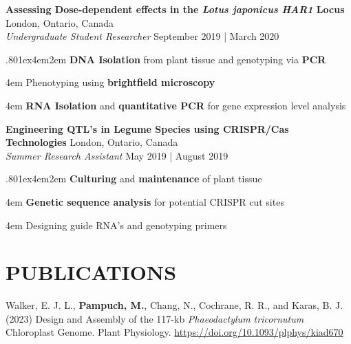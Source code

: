 \documentclass[a4paper,9pt]{extarticle}
\begin{document}
\noindent
\begin{minipage}{1\textwidth}
\setlength{\parindent}{15pt} %
	\noindent
	\textbf{Assessing Dose-dependent effects in the \textit{Lotus japonicus HAR1} Locus} \hfill London, Ontario, Canada\\ %
	\textit{Undergraduate Student Researcher}
	\hfill September 2019 | March 2020  \par %
	{\hsize.80\linewidth\parskip1ex\hangindent4em\parindent2em 
	\setlength{\parskip}{0pt} %
		\textbf{DNA Isolation} from plant tissue and genotyping via \textbf{PCR}\par
		\hangindent4em
		Phenotyping using \textbf{brightfield microscopy}\par
		\hangindent4em
		\textbf{RNA Isolation} and \textbf{quantitative PCR} for gene expression level analysis\par}
\end{minipage}
\vspace{\parskip}

\noindent
\begin{minipage}{1\textwidth}
\setlength{\parindent}{15pt} %
	\noindent
	\textbf{Engineering QTL's in Legume Species using CRISPR/Cas Technologies} \hfill London, Ontario, Canada\\ %
	\textit{Summer Research Assistant}
	\hfill May 2019 | August 2019 \par %
	{\hsize.80\linewidth\parskip1ex\hangindent4em\parindent2em 
	\setlength{\parskip}{0pt} %
		\textbf{Culturing} and \textbf{maintenance} of plant tissue \par
		\hangindent4em
		\textbf{Genetic sequence analysis} for potential CRISPR cut sites \par
		\hangindent4em
		Designing guide RNA's and genotyping primers \par}
\end{minipage}

\section*{PUBLICATIONS}
\noindent
\begin{minipage}{1\textwidth}
\setlength{\parindent}{15pt} %
	\noindent
	Walker, E. J. L., \textbf{Pampuch, M.}, Chang, N., Cochrane, R. R., and Karas, B. J. (2023) Design and Assembly of the 117-kb \textit{Phaeodactylum tricornutum} Chloroplast Genome. Plant Physiology. \href{https://doi.org/10.1093/plphys/kiad670}{https://doi.org/10.1093/plphys/kiad670} \\
\end{minipage}
\end{document}
